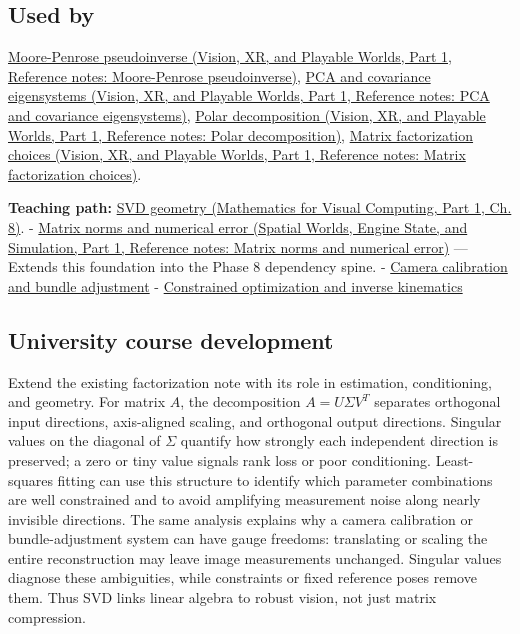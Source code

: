 \subsection{Used by}\label{appendix-1fad5e7f36fa-used-by}

\hypertarget{appendix-1fad5e7f36fa-used-by}{}

\href{../07-Vision-XR-and-Playable-Worlds-P01/main.pdf\#appendix-541306fdbc1b}{Moore-Penrose pseudoinverse (Vision, XR, and Playable Worlds, Part 1, Reference notes: Moore-Penrose pseudoinverse)}, \href{../07-Vision-XR-and-Playable-Worlds-P01/main.pdf\#appendix-ad175ef3c5bf}{PCA and covariance eigensystems (Vision, XR, and Playable Worlds, Part 1, Reference notes: PCA and covariance eigensystems)}, \href{../07-Vision-XR-and-Playable-Worlds-P01/main.pdf\#appendix-73f5bcf7a462}{Polar decomposition (Vision, XR, and Playable Worlds, Part 1, Reference notes: Polar decomposition)}, \href{../07-Vision-XR-and-Playable-Worlds-P01/main.pdf\#appendix-221a483bec2d}{Matrix factorization choices (Vision, XR, and Playable Worlds, Part 1, Reference notes: Matrix factorization choices)}.

\textbf{Teaching path:} \href{../02-Mathematics-for-Visual-Computing-P01/main.pdf\#02-foundations-ii-ch024-singular-value-decomposition-covers-every-rectangular-map}{SVD geometry (Mathematics for Visual Computing, Part 1, Ch. 8)}. - \href{../05-Spatial-Worlds-Engine-State-and-Simulation-P01/main.pdf\#appendix-f8657bac66e5}{Matrix norms and numerical error (Spatial Worlds, Engine State, and Simulation, Part 1, Reference notes: Matrix norms and numerical error)} --- Extends this foundation into the Phase 8 dependency spine. - \hyperref[appendix-3ee9861904d5]{Camera calibration and bundle adjustment} - \hyperref[appendix-29f4bea4c2bb]{Constrained optimization and inverse kinematics}

\subsection{University course development}\label{appendix-1fad5e7f36fa-university-course-development}

\hypertarget{appendix-1fad5e7f36fa-university-course-development}{}

Extend the existing factorization note with its role in estimation, conditioning, and geometry. For matrix \(A\), the decomposition \(A=U\Sigma V^T\) separates orthogonal input directions, axis-aligned scaling, and orthogonal output directions. Singular values on the diagonal of \(\Sigma\) quantify how strongly each independent direction is preserved; a zero or tiny value signals rank loss or poor conditioning. Least-squares fitting can use this structure to identify which parameter combinations are well constrained and to avoid amplifying measurement noise along nearly invisible directions. The same analysis explains why a camera calibration or bundle-adjustment system can have gauge freedoms: translating or scaling the entire reconstruction may leave image measurements unchanged. Singular values diagnose these ambiguities, while constraints or fixed reference poses remove them. Thus SVD links linear algebra to robust vision, not just matrix compression.

